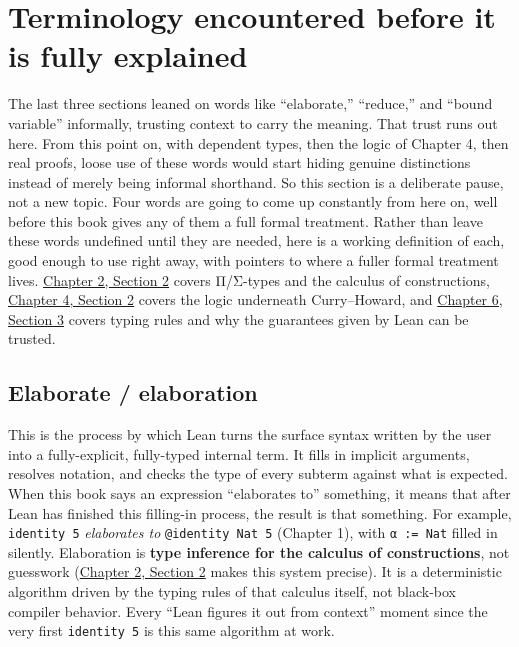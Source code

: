\section{Terminology encountered before it is fully explained}\label{sec:02-terminology-and-coc:01-terminology:1}

The last three sections leaned on words like ``elaborate,'' ``reduce,'' and ``bound variable'' informally, trusting context to carry the meaning. That trust runs out here. From this point on, with dependent types, then the logic of Chapter 4, then real proofs, loose use of these words would start hiding genuine distinctions instead of merely being informal shorthand. So this section is a deliberate pause, not a new topic. Four words are going to come up constantly from here on, well before this book gives any of them a full formal treatment. Rather than leave these words undefined until they are needed, here is a working definition of each, good enough to use right away, with pointers to where a fuller formal treatment lives. \hyperref[sec:02-terminology-and-coc:02-pi-sigma-and-coc:1]{Chapter 2, Section 2} covers Π/Σ-types and the calculus of constructions, \hyperref[sec:04-propositions-and-proofs:02-logic-recap:1]{Chapter 4, Section 2} covers the logic underneath Curry--Howard, and \hyperref[sec:06-rigor-check:03-typing-rules-and-safety:1]{Chapter 6, Section 3} covers typing rules and why the guarantees given by Lean can be trusted.

\subsection{Elaborate / elaboration}\label{sec:02-terminology-and-coc:01-terminology:2}

This is the process by which Lean turns the surface syntax written by the user into a fully-explicit, fully-typed internal term. It fills in implicit arguments, resolves notation, and checks the type of every subterm against what is expected. When this book says an expression ``elaborates to'' something, it means that after Lean has finished this filling-in process, the result is that something. For example, \texttt{identity 5} \emph{elaborates to} \texttt{@identity Nat 5} (Chapter 1), with \texttt{α := Nat} filled in silently. Elaboration is \textbf{type inference for the calculus of constructions}, not guesswork (\hyperref[sec:02-terminology-and-coc:02-pi-sigma-and-coc:1]{Chapter 2, Section 2} makes this system precise). It is a deterministic algorithm driven by the typing rules of that calculus itself, not black-box compiler behavior. Every ``Lean figures it out from context'' moment since the very first \texttt{identity 5} is this same algorithm at work.

